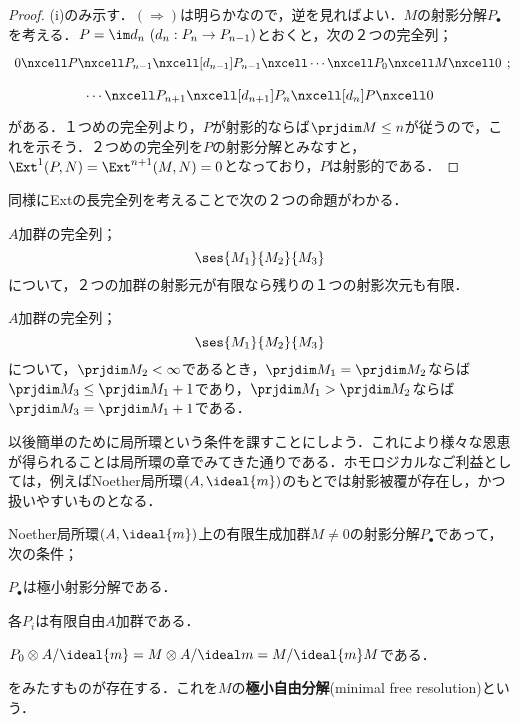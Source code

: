 \begin{proof}
	(i)のみ示す．$(\Longrightarrow)$は明らかなので，逆を見ればよい．$M$の射影分解$P_\bullet$を考える．$P=\im d_n~(d_n:P_n\to P_{n-1})$とおくと，次の２つの完全列；
	\[\begin{tikzcd}
	0\nxcell P\nxcell P_{n-1}\nxcell[d_{n-1}]P_{n-1}\nxcell\cdots\nxcell P_0\nxcell M\nxcell0\end{tikzcd};\]
	\[\begin{tikzcd}
	\cdots\nxcell P_{n+1}\nxcell[d_{n+1}]P_n\nxcell[d_n]P\nxcell0
	\end{tikzcd}\]
	がある．１つめの完全列より，$P$が射影的ならば$\prjdim M\leq n$が従うので，これを示そう．２つめの完全列を$P$の射影分解とみなすと，$\Ext^1(P,N)=\Ext^{n+1}(M,N)=0$となっており，$P$は射影的である．
\end{proof}

同様にExtの長完全列を考えることで次の２つの命題がわかる．
\begin{cor}\label{cor:prjdimの有限性}
	$A$加群の完全列；
	\[\ses{M_1}{M_2}{M_3}\]
	について，２つの加群の射影元が有限なら残りの１つの射影次元も有限．
\end{cor}

\begin{cor}\label{cor:prjdim lemma}
	$A$加群の完全列；
	\[\ses{M_1}{M_2}{M_3}\]
	について，$\prjdim M_2<\infty$であるとき，$\prjdim M_1=\prjdim M_2$ならば$\prjdim M_3\leq\prjdim M_1+1$であり，$\prjdim M_1>\prjdim M_2$ならば$\prjdim M_3=\prjdim M_1+1$である．
\end{cor}

以後簡単のために局所環という条件を課すことにしよう．これにより様々な恩恵が得られることは局所環の章でみてきた通りである．ホモロジカルなご利益としては，例えばNoether局所環$(A,\ideal{m})$のもとでは射影被覆が存在し，かつ扱いやすいものとなる．

\begin{defi}[極小自由分解]
	Noether局所環$(A,\ideal{m})$上の有限生成加群$M\neq0$の射影分解$P_\bullet$であって，次の条件；
	\begin{sakura}
		\item $P_\bullet$は極小射影分解である．
		\item 各$P_i$は有限自由$A$加群である．
		\item $P_0\otimes A/\ideal{m}=M\otimes A/\ideal m=M/\ideal{m}M$である．
	\end{sakura}
	をみたすものが存在する．これを$M$の\textbf{極小自由分解}(minimal free resolution)という．
\end{defi}

